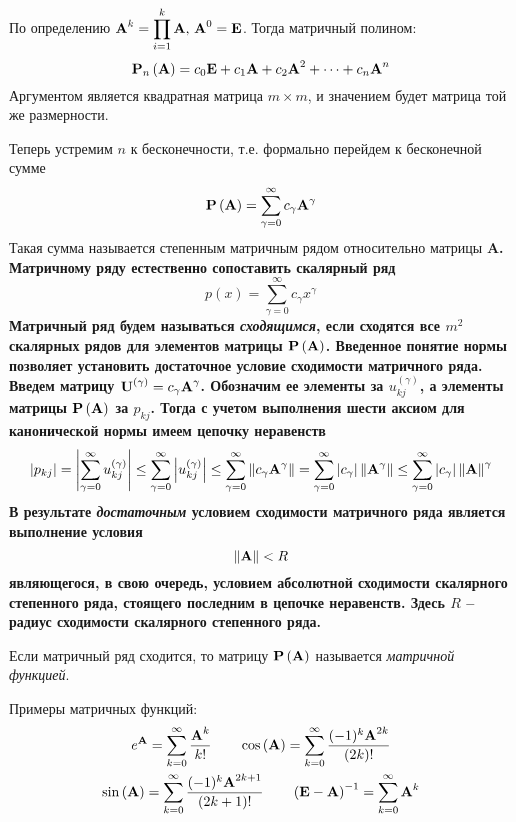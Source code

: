 По определению $\displaystyle \bf{A}^k = \prod_{i=1}^k \bf{A}, \, \bf{A}^0 = \bf{E}$. Тогда матричный полином:
\begin{equation*}
    \bf{P}_n \left( \bf{A} \right) = c_0 \bf{E} + c_1 \bf{A} + c_2 \bf{A}^2 + \dots + c_n \bf{A}^n
\end{equation*}
Аргументом является квадратная матрица $m \times m$, и значением будет матрица той же размерности.

Теперь устремим $n$ к бесконечности, т.е. формально перейдем к бесконечной сумме
\begin{equation}
    \bf{P}\left( \bf{A} \right) = \sum_{\gamma = 0}^{\infty} c_{\gamma} \bf{A}^{\gamma} \label{eq:matrix_row}
\end{equation}
Такая сумма называется степенным матричным рядом относительно матрицы \bf{A}. Матричному ряду естественно сопоставить
скалярный ряд
\begin{equation*}
    p(x) = \sum_{\gamma = 0}^{\infty} c_{\gamma} x^{\gamma}
\end{equation*}
Матричный ряд будем называться \emph{сходящимся}, если сходятся все $m^2$ скалярных рядов для элементов матрицы
$\bf{P}\left( \bf{A} \right)$. Введенное понятие нормы позволяет установить достаточное условие сходимости матричного
ряда. Введем матрицу $\displaystyle \bf{U}^{(\gamma)} = c_{\gamma}\bf{A}^{\gamma}$. Обозначим ее элементы за
$\displaystyle u_{kj}^{(\gamma)}$, а элементы матрицы $\bf{P} \left( \bf{A} \right)$ за $\displaystyle p_{kj}$. Тогда с учетом
выполнения шести аксиом для канонической нормы имеем цепочку неравенств
\begin{equation*}
    \displaystyle \left| p_{kj} \right| = \left| \sum_{\gamma = 0}^{\infty} u_{kj}^{(\gamma)} \right| \leq \sum_{\gamma = 0}^{\infty} \left| u_{kj}^{(\gamma)} \right|
    \leq \sum_{\gamma = 0}^{\infty} \left\| c_{\gamma} \bf{A}^{\gamma} \right\| = \sum_{\gamma = 0}^{\infty} \left| c_{\gamma} \right| \left\| \bf{A}^{\gamma} \right\|
    \leq \sum_{\gamma = 0}^{\infty} \left| c_{\gamma} \right| \left\| \bf{A} \right\|^{\gamma}
\end{equation*}
В результате \emph{достаточным} условием сходимости матричного ряда является выполнение условия
\begin{equation}
    \left\| \bf{A} \right\| < R
\end{equation}
являющегося, в свою очередь, условием абсолютной сходимости скалярного степенного ряда, стоящего последним в цепочке
неравенств. Здесь $R$ -- радиус сходимости скалярного степенного ряда.

\begin{definition}
    Если матричный ряд сходится, то матрицу $\bf{P} \left( \bf{A} \right)$ называется
    \emph{матричной функцией}.
\end{definition}
Примеры матричных функций:
\begin{gather*}
    e^{\bf{A}} = \sum_{k=0}^{\infty} \frac{\bf{A}^k}{k!} \qquad \cos\left( \bf{A} \right) = \sum_{k=0}^{\infty} \frac{(-1)^k \bf{A}^{2k}}{(2k)!} \\
    \sin \left( \bf{A} \right) = \sum_{k=0}^{\infty} \frac{(-1)^k \bf{A}^{2k + 1}}{(2k+1)!} \qquad \left( \bf{E} - \bf{A} \right)^{-1} = \sum_{k=0}^{\infty} \bf{A}^k
\end{gather*}
